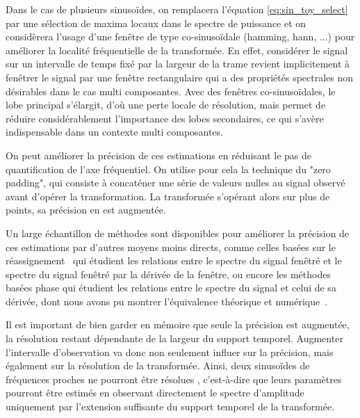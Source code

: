 Dans le cas de plusieurs sinusoïdes, on remplacera l'équation \ref{eq:sin_toy_select} par une sélection de maxima locaux dans le spectre de puissance et on considèrera l'usage d'une fenêtre de type co-sinusoïdale (hamming, hann, ...) pour améliorer la localité fréquentielle de la transformée\cite{harris1978use}. En effet, considérer le signal sur un intervalle de temps fixé par la largeur de la trame revient implicitement à fenêtrer le signal par une fenêtre rectangulaire qui a des propriétés spectrales non désirables dans le cas multi composantes. Avec des fenêtres co-sinusoïdales, le lobe principal s'élargit, d'où une perte locale de résolution, mais permet de réduire considérablement l'importance des lobes secondaires, ce qui s'avère indispensable dans un contexte multi composantes.

On peut améliorer la précision de ces estimations en réduisant le pas de quantification de l'axe fréquentiel. On utilise pour cela la technique du "zero padding", qui consiste à concaténer une série de valeurs nulles au signal observé avant d'opérer la transformation. La transformée s'opérant alors sur plus de points, sa précision en est augmentée.

Un large échantillon de méthodes sont disponibles pour améliorer la précision de ces estimations par d'autres moyens moins directs, comme  celles basées sur le réassignement~\cite{auger1995improving} qui étudient les relations entre le spectre du signal fenêtré et le spectre du signal fenêtré par la dérivée de la fenêtre, ou encore les méthodes basées phase qui étudient les relations entre le spectre du signal et celui de sa dérivée, dont nous avons pu montrer l'équivalence théorique et numérique~\cite{lagrangeJaes07}.

Il est important de bien garder en mémoire que seule la précision est augmentée, la résolution restant dépendante de la largeur du support temporel.  Augmenter l'intervalle d'observation va donc non seulement influer sur la précision, mais également sur la résolution de la transformée. Ainsi, deux sinusoïdes de fréquences proches ne pourront être \og résolues \fg, c'est-à-dire que leurs paramètres pourront être estimés en observant directement le spectre d'amplitude uniquement par l'extension suffisante du support temporel de la transformée.

